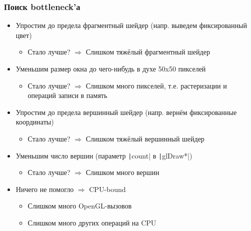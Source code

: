 \documentclass{beamer}
\begin{document}
\begin{frame}[fragile]
\fontsize{10pt}{10pt}
\frametitle{Поиск bottleneck'а}
\begin{itemize}
\item Упростим до предела фрагментный шейдер (напр. выведем фиксированный цвет)
\pause
\begin{itemize}
\item Стало лучше? \begin{math}\Longrightarrow\end{math} Слишком тяжёлый фрагментный шейдер
\end{itemize}
\pause
\item Уменьшим размер окна до чего-нибудь в духе 50x50 пикселей
\pause
\begin{itemize}
\item Стало лучше? \begin{math}\Longrightarrow\end{math} Слишком много пикселей, т.е. растеризации и операций записи в память
\end{itemize}
\pause
\item Упростим до предела вершинный шейдер (напр. вернём фиксированные координаты)
\pause
\begin{itemize}
\item Стало лучше? \begin{math}\Longrightarrow\end{math} Слишком тяжёлый вершинный шейдер
\end{itemize}
\pause
\item Уменьшим число вершин (параметр \texttt|count| в \texttt|glDraw*|)
\pause
\begin{itemize}
\item Стало лучше? \begin{math}\Longrightarrow\end{math} Слишком много вершин
\end{itemize}
\pause
\item Ничего не помогло \begin{math}\Longrightarrow\end{math} CPU-bound
\pause
\begin{itemize}
\item Слишком много OpenGL-вызовов
\pause
\item Слишком много других операций на CPU
\end{itemize}
\end{itemize}
\end{frame}
\end{document}
